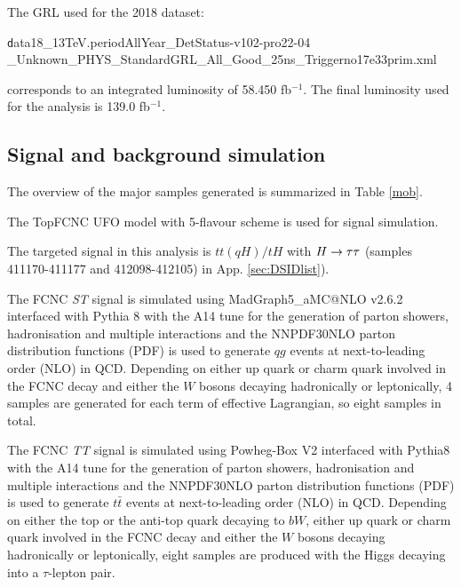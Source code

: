 The GRL used for the 2018 dataset:

\begin{centering}
{\texttt  data18\_13TeV.periodAllYear\_DetStatus-v102-pro22-04\\\_Unknown\_PHYS\_StandardGRL\_All\_Good\_25ns\_Triggerno17e33prim.xml}

\end{centering}
corresponds to an integrated luminosity of 58.450 fb$^{-1}$. The final luminosity used for the analysis is 139.0 fb$^{-1}$.

\subsection{Signal and background simulation}
\label{sec:generator}

The overview of the major samples generated is summarized in Table \ref{mob}.

The TopFCNC UFO model \cite{FCNC_UFO1,FCNC_UFO2} with 5-flavour scheme is used for signal simulation.

The targeted signal in this analysis is $tt(qH)/tH$ with $H \rightarrow \tau\tau$ (samples 411170-411177 and 412098-412105) in App. \ref{sec:DSIDlist}).

The FCNC \textit{ST} signal is simulated using MadGraph5\_aMC@NLO v2.6.2 \cite{MG5} interfaced with Pythia 8 \cite{Pythia8} with the A14 tune \cite{A14} for the generation of parton showers, hadronisation and multiple interactions and the NNPDF30NLO \cite{NNPDF30NLO} parton distribution functions (PDF) is used to generate $qg$ events at next-to-leading order (NLO) in QCD. Depending on either up quark or charm quark involved in the FCNC decay and either the $W$ bosons decaying hadronically or leptonically, 4 samples are generated for each term of effective Lagrangian, so eight samples in total.

The FCNC \textit{TT} signal is simulated using Powheg-Box \cite{Powheg} V2 interfaced with Pythia8 \cite{Pythia8} with the A14 tune \cite{A14} for the generation of parton showers, hadronisation and multiple interactions and the NNPDF30NLO \cite{NNPDF30NLO} parton distribution functions (PDF) is used to generate $t\bar{t}$ events at next-to-leading order (NLO) in QCD. Depending on either the top or the anti-top quark decaying to $bW$, either up quark or charm quark involved in the FCNC decay and either the $W$ bosons decaying hadronically or leptonically, eight samples are produced with the Higgs decaying into a $\tau$-lepton pair.

